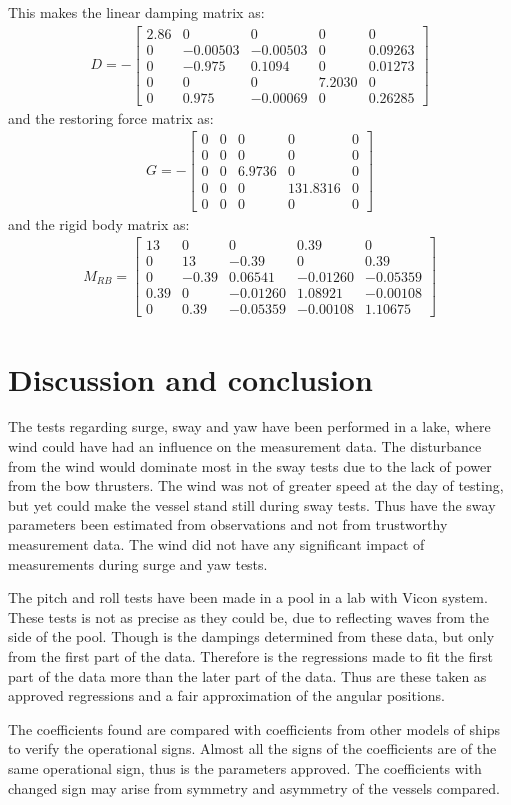 This makes the linear damping matrix as:
\begin{align}
D = -
\begin{bmatrix}
2.86 & 0 & 0 & 0 & 0\\
0 & -0.00503 & -0.00503 & 0 & 0.09263\\
0 & -0.975 & 0.1094 & 0 & 0.01273\\
0 & 0 & 0 & 7.2030 & 0\\
0 & 0.975 & -0.00069 & 0 & 0.26285
\end{bmatrix}
\end{align}
and the restoring force matrix as:
\begin{align}
G = -
\begin{bmatrix}
0 & 0 & 0 & 0 & 0\\
0 & 0 & 0 & 0 & 0\\
0 & 0 & 6.9736 & 0 & 0\\
0 & 0 & 0 & 131.8316 & 0\\
0 & 0 & 0 & 0 & 0
\end{bmatrix}
\end{align}
and the rigid body matrix as:
\begin{align}
M_{RB} =
\begin{bmatrix}
13 & 0 & 0 & 0.39 & 0\\
0 & 13 & -0.39 & 0 & 0.39\\
0 & -0.39 & 0.06541 & -0.01260 & -0.05359\\
0.39 & 0 & -0.01260 & 1.08921 & -0.00108\\
0 & 0.39 & -0.05359 & -0.00108 & 1.10675
\end{bmatrix}
\end{align}
\section{Discussion and conclusion}
The tests regarding surge, sway and yaw have been performed in a lake, where wind could have had an influence on the measurement data. The disturbance from the wind would dominate most in the sway tests due to the lack of power from the bow thrusters. The wind was not of greater speed at the day of testing, but yet could make the vessel stand still during sway tests. Thus have the sway parameters been estimated from observations and not from trustworthy measurement data. The wind did not have any significant impact of measurements during surge and yaw tests.

The pitch and roll tests have been made in a pool in a lab with Vicon system. These tests is not as precise as they could be, due to reflecting waves from the side of the pool. Though is the dampings determined from these data, but only from the first part of the data. Therefore is the regressions made to fit the first part of the data more than the later part of the data. Thus are these taken as approved regressions and a fair approximation of the angular positions.

The coefficients found are compared with coefficients from other models of ships to verify the operational signs. Almost all the signs of the coefficients are of the same operational sign, thus is the parameters approved. The coefficients with changed sign may arise from symmetry and asymmetry of the vessels compared.
